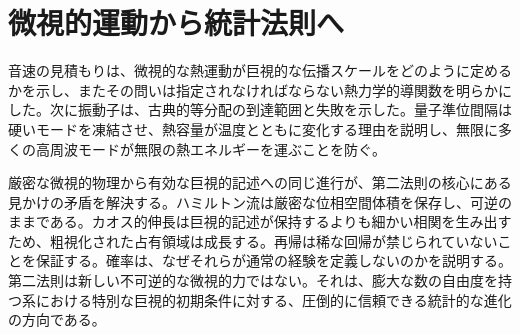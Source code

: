 \begin{classroomqa}
\end{classroomqa}

\section{微視的運動から統計法則へ}

音速の見積もりは、微視的な熱運動が巨視的な伝播スケールをどのように定めるかを示し、またその問いは指定されなければならない熱力学的導関数を明らかにした。次に振動子は、古典的等分配の到達範囲と失敗を示した。量子準位間隔は硬いモードを凍結させ、熱容量が温度とともに変化する理由を説明し、無限に多くの高周波モードが無限の熱エネルギーを運ぶことを防ぐ。

厳密な微視的物理から有効な巨視的記述への同じ進行が、第二法則の核心にある見かけの矛盾を解決する。ハミルトン流は厳密な位相空間体積を保存し、可逆のままである。カオス的伸長は巨視的記述が保持するよりも細かい相関を生み出すため、粗視化された占有領域は成長する。再帰は稀な回帰が禁じられていないことを保証する。確率は、なぜそれらが通常の経験を定義しないのかを説明する。第二法則は新しい不可逆的な微視的力ではない。それは、膨大な数の自由度を持つ系における特別な巨視的初期条件に対する、圧倒的に信頼できる統計的な進化の方向である。
